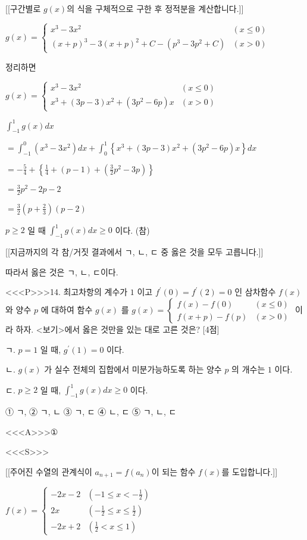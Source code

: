 \documentclass{oblivoir}
\begin{document}
[[구간별로 $g(x)$의 식을 구체적으로 구한 후 정적분을 계산합니다.]]

$g(x)= \begin{cases}x^{3}-3 x^{2} & (x \leq 0)\\ (x+p)^{3}-3(x+p)^{2}+C-\left(p^{3}-3 p^{2}+C\right) &(x>0)\end{cases}$

정리하면

$g(x)=\begin{cases}
x^{3}-3 x^{2} & (x \leq 0)\\
x^{3}+(3 p-3) x^{2}+\left(3 p^{2}-6 p\right) x & (x>0)
\end{cases}$

$\int_{-1}^{1} g(x) d x$

$=\int_{-1}^{0}\left(x^{3}-3 x^{2}\right)dx+\int_{0}^{1}\left\{x^{3}+(3 p-3) x^{2}+\left(3 p^{2}-6 p\right) x\right\} d x$

$=-\frac{5}{4}+\left\{\frac{1}{4}+(p-1)+\left(\frac{3}{2} p^{2}-3 p\right)\right\}$

$=\frac{3}{2} p^{2}-2 p-2$

$=\frac{3}{2}\left(p+\frac{2}{3}\right)(p-2)$

$p \geq 2 $ 일 때 $\int_{-1}^{1} g(x) d x \geq 0 $ 이다. (참)

[[지금까지의 각 참/거짓 결과에서 ㄱ, ㄴ, ㄷ 중 옳은 것을 모두 고릅니다.]]

따라서 옳은 것은 ㄱ, ㄴ, ㄷ이다.


<<<P>>>14. 최고차항의 계수가 $1$ 이고 $f^{\prime}(0)=f^{\prime}(2)=0$ 인 삼차함수 $f(x)$ 와 양수 $p$ 에 대하여 함수 $g(x)$ 를
$g(x)= \begin{cases}f(x)-f(0) & (x \leq 0) \\ f(x+p)-f(p) & (x>0)\end{cases}$
이라 하자. <보기>에서 옳은 것만을 있는 대로 고른 것은? [4점]

ㄱ. $p=1$ 일 때, $g^{\prime}(1)=0$ 이다.

ㄴ. $g(x)$ 가 실수 전체의 집합에서 미분가능하도록 하는 양수 $p$ 의 개수는 $1$ 이다.

ㄷ. $p \geq 2$ 일 때, $\int_{-1}^{1} g(x) d x \geq 0$ 이다.

① ㄱ,
② ㄱ, ㄴ
③ ㄱ, ㄷ
④ ㄴ, ㄷ
⑤ ㄱ, ㄴ, ㄷ


<<<A>>>①

<<<S>>>

[[주어진 수열의 관계식이 $a_{n+1}=f\left(a_{n}\right)$이 되는 함수 $f(x)$를 도입합니다.]]

$f(x)=\left\{\begin{array}{cl}-2 x-2 & \left(-1 \leq x<-\frac{1}{2}\right) \\ 2 x & \left(-\frac{1}{2} \leq x \leq \frac{1}{2}\right) \\ -2 x+2 & \left(\frac{1}{2}<x \leq 1\right)\end{array}\right.$
\end{document}
